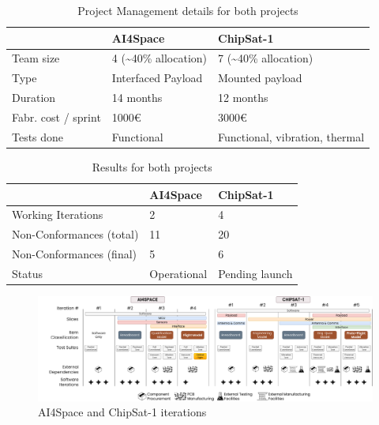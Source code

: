 \documentclass[journal,10pt]{IEEEtran}
\begin{document}
\begin{table}[h]
	\centering
	\caption{Project Management details for both projects}
	\label{tab:case_pm}
	\begin{tabularx}{\linewidth}{@{}lXX@{}}
		\toprule
		& AI4Space & ChipSat-1 \\ \midrule
		Team size & 4 (\textasciitilde 40\% allocation) & 7 (\textasciitilde 40\% allocation) \\
		Type & Interfaced Payload & Mounted payload \\
		Duration & 14 months & 12 months \\ %
		Fabr. cost / sprint & 1000€  & 3000€ \\ %
		Tests done & Functional & Functional, vibration, thermal \\
		\bottomrule
	\end{tabularx}
\end{table}

\begin{table}[h]
	\centering
	\caption{Results for both projects}
	\label{tab:case_result}
	\begin{tabular}{@{}lll@{}}
		\toprule
		& AI4Space & ChipSat-1 \\ \midrule
		Working Iterations & 2 & 4 \\
		Non-Conformances (total) & 11 & 20 \\
		Non-Conformances (final) & 5 & 6 \\
		Status & Operational & Pending launch \\%
		\bottomrule
	\end{tabular}
\end{table}



\begin{figure}[h]
	\centering
	\includegraphics[width=\textwidth]{media/AllProjectSlices.drawio.pdf}
	\caption{AI4Space and ChipSat-1 iterations}
	\label{fig:project1scrum}
	\label{fig:project2scrum}
	\label{fig:scrums}
\end{figure}
\end{document}
